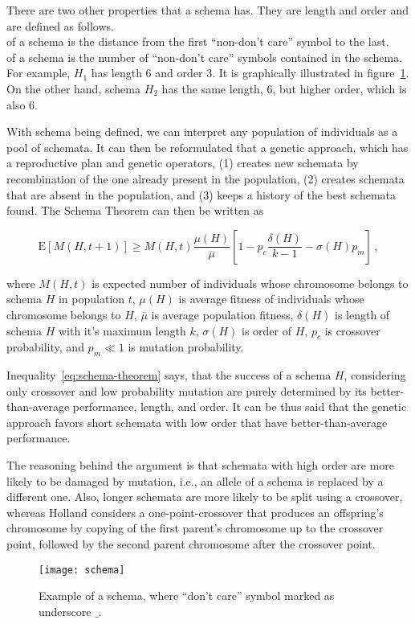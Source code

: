 There are two other properties that a schema has. They are length and order and are defined as follows.\\

 of a schema is the distance from the first “non-don’t care” symbol to the last.\\

 of a schema is the number of “non-don’t care” symbols contained in the schema.\\

For example, $H_1$ has length $6$ and order $3$.
It is graphically illustrated in figure~\ref{fig:schema}.
On the other hand, schema $H_2$ has the same length, $6$, but higher order, which is also $6$.

With schema being defined, we can interpret any population of individuals as a pool of schemata.
It can then be reformulated that a genetic approach, which has a reproductive plan and
genetic operators, (1) creates new schemata by recombination of the one already present in the population,
(2) creates schemata that are absent in the population, and (3) keeps a history of the best schemata found.
The Schema Theorem can then be written as

\begin{equation}
    \mathrm{E}[M(H, t+1)] \geq M(H, t) \dfrac{\mu(H)}{\overline{\mu}}\left[ 1 - p_c \dfrac{\delta(H)}{k-1} - \sigma(H)
    p_m \right]\,,
    \label{eq:schema-theorem}
\end{equation}

where $M(H, t)$ is expected number of individuals whose chromosome belongs to schema $H$ in population $t$,
$\mu(H)$ is average fitness of individuals whose chromosome belongs to $H$,
$\overline{\mu}$ is average population fitness,
$\delta(H)$ is length of schema $H$ with it’s maximum length $k$,
$\sigma(H)$ is order of $H$,
$p_c$ is crossover probability, and
$p_m \ll 1$ is mutation probability.

Inequality~\ref{eq:schema-theorem} says, that the success of a schema $H$,
considering only crossover and low probability mutation are purely determined
by its better-than-average performance, length, and order.
It can be thus said that the genetic approach favors
short schemata with low order that have better-than-average performance.

The reasoning behind the argument is that schemata with high order are more likely
to be damaged by mutation, i.e., an allele of a schema is replaced by a different one.
Also, longer schemata are more likely to be split using a crossover, whereas Holland
considers a one-point-crossover that produces an offspring’s chromosome by copying
of the first parent’s chromosome up to the crossover point, followed by the second parent chromosome after the crossover point.

\begin{figure}[h]
    \texttt{[image: schema]}
    \caption[Example of a schema]{Example of a schema, where “don’t care” symbol marked as underscore $\_$.}
    \label{fig:schema}
\end{figure}
